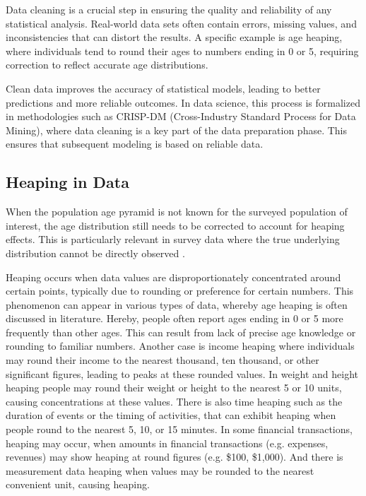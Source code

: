 \documentclass[12pt]{article}
\theoremstyle{plain}
\theoremstyle{definition}
\begin{document}
Data cleaning is a crucial step in ensuring the quality and reliability of any statistical analysis. Real-world data sets often contain errors, missing values, and inconsistencies that can distort the results. A specific example is age heaping, where individuals tend to round their ages to numbers ending in 0 or 5, requiring correction to reflect accurate age distributions.

Clean data improves the accuracy of statistical models, leading to better predictions and more reliable outcomes. In data science, this process is formalized in methodologies such as CRISP-DM (Cross-Industry Standard Process for Data Mining), where data cleaning is a key part of the data preparation phase. This ensures that subsequent modeling is based on reliable data.


\subsection{Heaping in Data}

When the population age pyramid is not known for the surveyed population of interest, the age distribution still needs to be corrected to account for heaping effects. This is particularly relevant in survey data where the true underlying distribution cannot be directly observed \citep{ewbank1981}.

Heaping occurs when data values are disproportionately concentrated around certain points, typically due to rounding or preference for certain numbers. This phenomenon can appear in various types of data, whereby age heaping is often discussed in literature. Hereby, people often report ages ending in 0 or 5 more frequently than other ages. This can result from lack of precise age knowledge or rounding to familiar numbers. Another case is income heaping where individuals may round their income to the nearest thousand, ten thousand, or other significant figures, leading to peaks at these rounded values. In weight and height heaping people may round their weight or height to the nearest 5 or 10 units, causing concentrations at these values. There is also time heaping such as the duration of events or the timing of activities, that can exhibit heaping when people round to the nearest 5, 10, or 15 minutes. In some financial transactions, heaping may occur, when amounts in financial transactions (e.g. expenses, revenues) may show heaping at round figures (e.g. \$100, \$1,000).
And there is measurement data heaping when values may be rounded to the nearest convenient unit, causing heaping.
\end{document}

